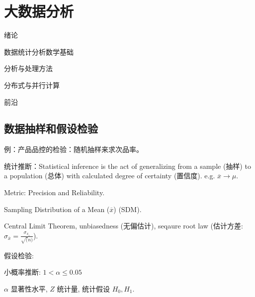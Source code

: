 \chapter{大数据分析}
\label{chap:big_data_analysis}


\begin{learningobjectives}
	\item 绪论
	\item 数据统计分析数学基础
	\item 分析与处理方法
	\item 分布式与并行计算
	\item 前沿
\end{learningobjectives}


\section{数据抽样和假设检验}

例：产品品控的检验：随机抽样来求次品率。

统计推断：Statistical inference is the act of generalizing from a sample (抽样) to a population (总体) with calculated degree of certainty (置信度).
e.g. $\overline{x} \rightarrow \mu$.

Metric: Precision and Reliability.

Sampling Distribution of a Mean ($\overline{x}$) (SDM).

Central Limit Theorem, unbiasedness (无偏估计), seqaure root law (估计方差: $\sigma_{\overline{x}} = \frac{\sigma_{x_i}}{\sqrt(n)}$).

假设检验:

小概率推断: $1 < \alpha \le 0.05$

$\alpha$ 显著性水平, $Z$ 统计量, 统计假设 $H_0,H_1$.
